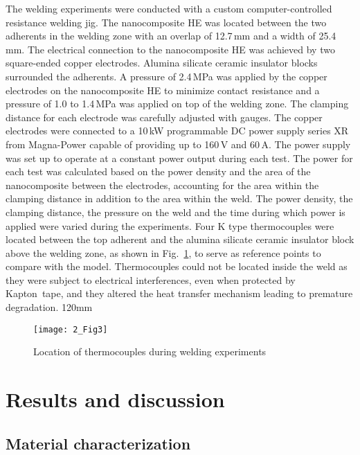 The welding experiments were conducted with a custom computer-controlled resistance welding jig. 
The nanocomposite HE was located between the two adherents in the welding zone with an overlap of \mbox{12.7\,mm} and a width of \mbox{25.4\,mm}. 
The electrical connection to the nanocomposite HE was achieved by two square-ended copper electrodes. 
Alumina silicate ceramic insulator blocks surrounded the adherents. 
A pressure of \mbox{2.4\,MPa} was applied by the copper electrodes on the nanocomposite HE to minimize contact resistance and a pressure of 1.0 to \mbox{1.4\,MPa} was applied on top of the welding zone. 
The clamping distance for each electrode was carefully adjusted with gauges. 
The copper electrodes were connected to a \mbox{10\,kW} programmable DC power supply series XR from Magna-Power capable of providing up to \mbox{160\,V} and \mbox{60\,A}. 
The power supply was set up to operate at a constant power output during each test. 
The power for each test was calculated based on the power density and the area of the nanocomposite between the electrodes, accounting for the area within the clamping distance in addition to the area within the weld. 
The power density, the clamping distance, the pressure on the weld and the time during which power is applied were varied during the experiments. 
Four K type thermocouples were located between the top adherent and the alumina silicate ceramic insulator block above the welding zone, as shown in \mbox{Fig. \ref{fig:2_Fig3}}, to serve as reference points to compare with the model. 
Thermocouples could not be located inside the weld as they were subject to electrical interferences, even when protected by Kapton\textregistered \ tape, and they altered the heat transfer mechanism leading to premature degradation.  120mm

\begin{figure}[ht]
	\center
	\texttt{[image: 2\_Fig3]}
	\caption{Location of thermocouples during welding experiments}
	\label{fig:2_Fig3}
\end{figure} 

\FloatBarrier
\section{Results and discussion}

\subsection{Material characterization}


